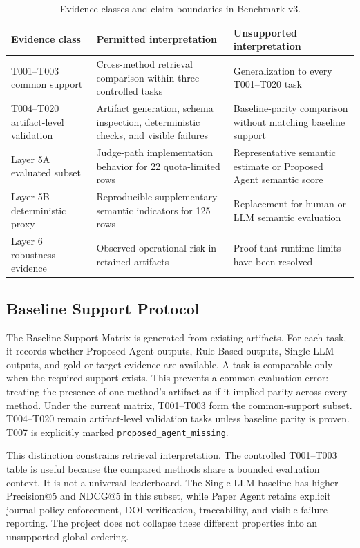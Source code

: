 \documentclass[10pt,twocolumn]{article}
\begin{document}
\begin{table}[t]
\centering
\footnotesize
\begin{tabularx}{\textwidth}{l X X}
\toprule
Evidence class & Permitted interpretation & Unsupported interpretation \\
\midrule
T001--T003 common support & Cross-method retrieval comparison within three controlled tasks & Generalization to every T001--T020 task \\
T004--T020 artifact-level validation & Artifact generation, schema inspection, deterministic checks, and visible failures & Baseline-parity comparison without matching baseline support \\
Layer 5A evaluated subset & Judge-path implementation behavior for 22 quota-limited rows & Representative semantic estimate or Proposed Agent semantic score \\
Layer 5B deterministic proxy & Reproducible supplementary semantic indicators for 125 rows & Replacement for human or LLM semantic evaluation \\
Layer 6 robustness evidence & Observed operational risk in retained artifacts & Proof that runtime limits have been resolved \\
\bottomrule
\end{tabularx}
\caption{Evidence classes and claim boundaries in Benchmark v3.}
\label{tab:evidenceboundary}
\end{table}

\subsection{Baseline Support Protocol}
The Baseline Support Matrix is generated from existing artifacts. For each task, it records whether Proposed Agent outputs, Rule-Based outputs, Single LLM outputs, and gold or target evidence are available. A task is comparable only when the required support exists. This prevents a common evaluation error: treating the presence of one method's artifact as if it implied parity across every method. Under the current matrix, T001--T003 form the common-support subset. T004--T020 remain artifact-level validation tasks unless baseline parity is proven. T007 is explicitly marked \texttt{proposed\_agent\_missing}.

This distinction constrains retrieval interpretation. The controlled T001--T003 table is useful because the compared methods share a bounded evaluation context. It is not a universal leaderboard. The Single LLM baseline has higher Precision@5 and NDCG@5 in this subset, while Paper Agent retains explicit journal-policy enforcement, DOI verification, traceability, and visible failure reporting. The project does not collapse these different properties into an unsupported global ordering.
\end{document}
